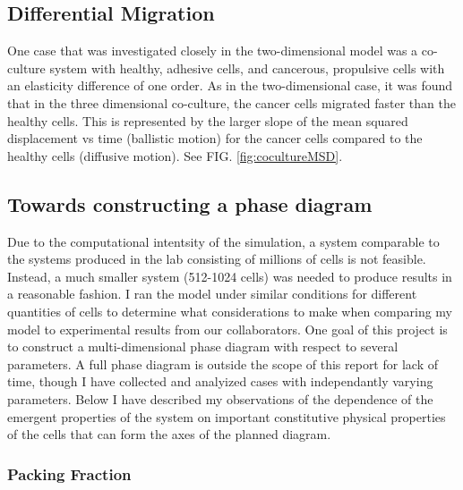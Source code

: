 \documentclass[aps,prb,twocolumn,groupedaddress,nofootinbib,floatfix]{revtex4}
\begin{document}
\subsection{Differential Migration}
One case that was investigated closely in the two-dimensional model was a co-culture system with healthy, adhesive cells, and cancerous, propulsive cells with an elasticity difference of one order.
As in the two-dimensional case, it was found that in the three dimensional co-culture, the cancer cells migrated faster than the healthy cells.
This is represented by the larger slope of the mean squared displacement vs time (ballistic motion) for the cancer cells compared to the healthy cells (diffusive motion). See FIG. \ref{fig:cocultureMSD}.

\subsection{Towards constructing a phase diagram}

Due to the computational intentsity of the simulation, a system comparable to the systems produced in the lab consisting of millions of cells is not feasible.
Instead, a much smaller system (512-1024 cells) was needed to produce results in a reasonable fashion. I ran the model under similar conditions for different quantities of cells to determine what considerations to make when comparing my model to experimental results from our collaborators.
One goal of this project is to construct a multi-dimensional phase diagram with respect to several parameters.
A full phase diagram is outside the scope of this report for lack of time, though I have collected and analyized cases with independantly varying parameters.
Below I have described my observations of the dependence of the emergent properties of the system on important constitutive  physical properties of the cells that can form the axes of the planned diagram.

\subsubsection{Packing Fraction}
\end{document}
